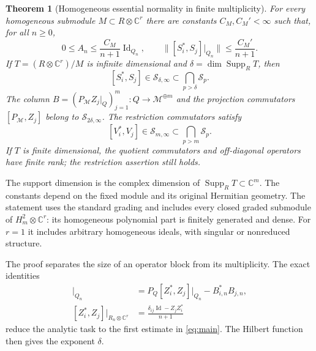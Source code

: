 \documentclass[11pt,reqno]{amsart}
\newtheorem{theorem}{Theorem}
\theoremstyle{remark}
\newcommand{\C}{\mathbb C}
\newcommand{\cS}{\mathcal S}
\DeclareMathOperator{\Supp}{Supp}
\DeclareMathOperator{\Id}{Id}
\begin{document}
\begin{theorem}[Homogeneous essential normality in finite multiplicity]\label{thm:main}
For every homogeneous submodule $M\subset R\otimes\C^r$ there are
constants $C_M,C_M'<\infty$ such that, for all $n\ge0$,
\begin{equation}\label{eq:main}
 0\le A_n\le\frac{C_M}{n+1}\Id_{Q_n},
 \qquad
 \|[S_i^*,S_j]|_{Q_n}\|\le\frac{C_M'}{n+1}.
\end{equation}
If $T=(R\otimes\C^r)/M$ is infinite dimensional and
$\delta=\dim\Supp_R T$, then
\begin{equation}\label{eq:weak}
 [S_i^*,S_j]\in\cS_{\delta,\infty}
 \subset\bigcap_{p>\delta}\cS_p.
\end{equation}
The column $B=(P_{\mathcal M}Z_j|_Q)_{j=1}^m:Q\to\mathcal M^{\oplus m}$
and the projection commutators $[P_{\mathcal M},Z_j]$ belong to
$\cS_{2\delta,\infty}$. The restriction commutators satisfy
\[
 [V_i^*,V_j]\in\cS_{m,\infty}
 \subset\bigcap_{p>m}\cS_p.
\]
If $T$ is finite dimensional, the quotient commutators and off-diagonal
operators have finite rank; the restriction assertion still holds.
\end{theorem}

The support dimension is the complex dimension of
$\Supp_R T\subset\C^m$. The constants depend on the fixed module and
its original Hermitian geometry. The statement uses the standard
grading and includes every closed graded submodule of
$H_m^2\otimes\C^r$: its homogeneous polynomial part is finitely
generated and dense. For $r=1$ it includes arbitrary homogeneous
ideals, with singular or nonreduced structure.

The proof separates the size of an operator block from its multiplicity.
The exact identities
\begin{align}
 [S_i^*,S_j]|_{Q_n}
 &=P_Q[Z_i^*,Z_j]|_{Q_n}-B_{i,n}^*B_{j,n},\label{eq:compression}\\
 [Z_i^*,Z_j]|_{R_n\otimes\C^r}
 &=\frac{\delta_{ij}\Id-Z_jZ_i^*}{n+1}\label{eq:ambient}
\end{align}
reduce the analytic task to the first estimate in \eqref{eq:main}.
The Hilbert function then gives the exponent $\delta$.
\end{document}
